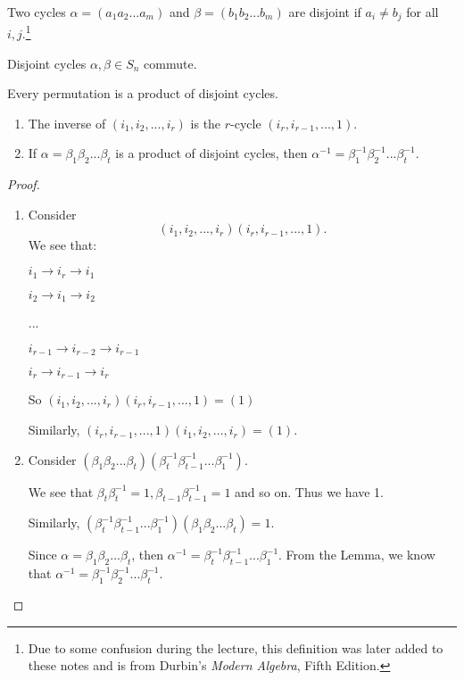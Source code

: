 \begin{defn}
	Two cycles $\alpha = (a_1 a_2 ... a_m)$ and $\beta = (b_1 b_2 ... b_m)$ are disjoint if $a_i \neq b_j$ for all $i, j$.\footnote{Due to some confusion during the lecture, this definition was later added to these notes and is from Durbin's \emph{Modern Algebra}, Fifth Edition.}
\end{defn}

\begin{lem}
	Disjoint cycles $\alpha, \beta \in S_n$ commute.
\end{lem}

\begin{note}
	Every permutation is a product of disjoint cycles.
\end{note}

\begin{thm}
	\begin{enumerate}
		\item The inverse of $(i_1, i_2, ..., i_r)$ is the $r$-cycle $(i_r, i_{r-1}, ..., 1)$.
		\item If $\alpha = \beta_1 \beta_2 ... \beta_t$ is a product of disjoint cycles, then $\alpha^{-1} = \beta^{-1}_1 \beta^{-1}_2 ... \beta^{-1}_t$.
	\end{enumerate}
\end{thm}

\begin{proof}
	\begin{enumerate}
		\item Consider $$(i_1, i_2, ..., i_r)(i_r, i_{r-1}, ..., 1).$$  We see that:
		
		$i_1 \rightarrow i_r \rightarrow i_1$
		
		$i_2 \rightarrow i_1 \rightarrow i_2$
		
		...
		
		$i_{r-1} \rightarrow i_{r-2} \rightarrow i_{r-1}$
		
		$i_{r} \rightarrow i_{r-1} \rightarrow i_{r}$
		
		So $(i_1, i_2, ..., i_r)(i_r, i_{r-1}, ..., 1) = (1)$
		
		Similarly, $(i_r, i_{r-1}, ..., 1)(i_1, i_2, ..., i_r) = (1)$.
		
		\vspace{10 pt}
		
		\item Consider $(\beta_1 \beta_2 ... \beta_t)(\beta^{-1}_t \beta^{-1}_{t-1} ... \beta^{-1}_1)$.
		
		We see that $\beta_t \beta^{-1}_t = 1, \beta_{t-1} \beta^{-1}_{t-1} = 1$ and so on.  Thus we have 1.
		
		Similarly, $(\beta^{-1}_t \beta^{-1}_{t-1} ... \beta^{-1}_1)(\beta_1 \beta_2 ... \beta_t) = 1$.
		
		Since $\alpha = \beta_1 \beta_2 ... \beta_t$, then $\alpha^{-1} = \beta_t^{-1} \beta_{t-1}^{-1}...\beta_1^{-1}$.  From the Lemma, we know that $\alpha^{-1} = \beta_1^{-1} \beta_2^{-1}...\beta_t^{-1}$.
	\end{enumerate}
\end{proof}


